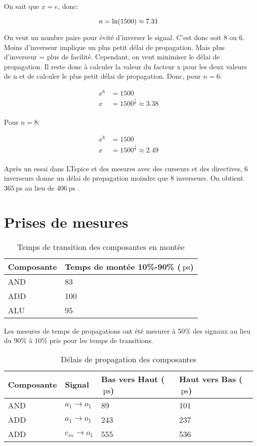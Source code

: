 \documentclass[a11paper]{article}
\newcommand{\quicktab}[4]{
  \begin{table}[H]
    \centering
    \caption{#1}
    \label{tab:#2}
    \begin{tabular}{#3}
      #4
    \end{tabular}
  \end{table}
}
\begin{document}
On sait que $x=e$, donc:

\begin{equation}
n=\ln(1500) \approx7.31 \\
\end{equation}

On veut un nombre paire pour évité d'inverser le signal. C'est donc soit $8$ ou $6$.
Moins d'inverseur implique un plus petit délai de propagation. Mais plus d'inverseur = plus de facilité. Cependant, on veut minimiser le délai de propagation.
Il reste donc à calculer la valeur du facteur x pour les deux valeurs de n et de calculer le plus petit délai de propagation.
Donc, pour $n=6$:

\begin{align}
  x^6 &=1500 \\
  x &=1500^{\frac{1}{6}} \approx3.38 \\
\end{align}

Pour $n=8$:

\begin{align}
  x^8 &= 1500 \\
  x   &= 1500^{\frac{1}{8}} \approx 2.49 \\
\end{align}

Après un essai dans LTspice et des mesures avec des curseurs et des directives,
6 inverseurs donne un délai de propagation moindre que 8 inverseurs.
On obtient $\SI{365}{\pico\s}$ au lieu de $\SI{406}{\pico\s}$ .

\section{Prises de mesures}

\quicktab{Temps de transition des composantes en montée}{ttLH-Sortie}{ll}{
\toprule
Composante & Temps de montée 10\%-90\% ($\SI{}{\pico\s}$) \\
\midrule
AND & 83 \\
ADD & 100 \\ %
ALU & 95 \\
\bottomrule
}

Les mesures de temps de propagations ont été mesurer à 50\% des signaux au lieu du 90\% à 10\% pris pour les temps de transitions.

\quicktab{Délais de propagation des composantes}{propagation}{llll}{
\toprule
Composante & Signal & Bas vers Haut ($\SI{}{\pico\s}$) & Haut vers Bas ($\SI{}{\pico\s}$) \\
\midrule
AND & $a_1 \rightarrow o_1$ & 89 & 101 \\
ADD & $a_1 \rightarrow o_1$ & 243 & 237 \\
ADD & $c_{in} \rightarrow o_1$ & 555 & 536 \\
\bottomrule
}




\end{document}
